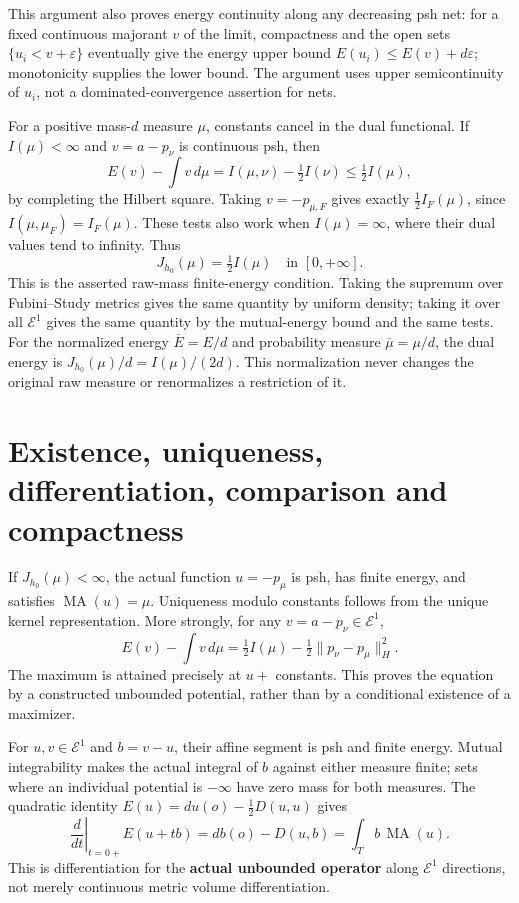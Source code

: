 \documentclass[
  11pt,
]{article}
\begin{document}
This argument also proves energy continuity along any decreasing psh
net: for a fixed continuous majorant \(v\) of the limit, compactness and
the open sets \(\{u_i<v+\varepsilon\}\) eventually give the energy upper
bound \(E(u_i)\leq E(v)+d\varepsilon\); monotonicity supplies the lower
bound. The argument uses upper semicontinuity of \(u_i\), not a
dominated-convergence assertion for nets.

For a positive mass-\(d\) measure \(\mu\), constants cancel in the dual
functional. If \(I(\mu)<\infty\) and \(v=a-p_\nu\) is continuous psh,
then \[
E(v)-\int v\,d\mu=I(\mu,\nu)-\tfrac12 I(\nu)
\leq\tfrac12 I(\mu),
\] by completing the Hilbert square. Taking \(v=-p_{\mu,F}\) gives
exactly \(\tfrac12 I_F(\mu)\), since \(I(\mu,\mu_F)=I_F(\mu)\). These
tests also work when \(I(\mu)=\infty\), where their dual values tend to
infinity. Thus \[
J_{h_0}(\mu)=\tfrac12 I(\mu)\quad\text{in }[0,+\infty].
\] This is the asserted raw-mass finite-energy condition. Taking the
supremum over Fubini--Study metrics gives the same quantity by uniform
density; taking it over all \(\mathcal E^1\) gives the same quantity by
the mutual-energy bound and the same tests. For the normalized energy
\(\overline E=E/d\) and probability measure \(\overline\mu=\mu/d\), the
dual energy is \(J_{h_0}(\mu)/d=I(\mu)/(2d)\). This normalization never
changes the original raw measure or renormalizes a restriction of it.

\section{Existence, uniqueness, differentiation, comparison and
compactness}\label{existence-uniqueness-differentiation-comparison-and-compactness}

If \(J_{h_0}(\mu)<\infty\), the actual function \(u=-p_\mu\) is psh, has
finite energy, and satisfies \(\operatorname{MA}(u)=\mu\). Uniqueness
modulo constants follows from the unique kernel representation. More
strongly, for any \(v=a-p_\nu\in\mathcal E^1\), \[
E(v)-\int v\,d\mu
=\tfrac12 I(\mu)-\tfrac12\|p_\nu-p_\mu\|_H^2.
\] The maximum is attained precisely at \(u+\) constants. This proves
the equation by a constructed unbounded potential, rather than by a
conditional existence of a maximizer.

For \(u,v\in\mathcal E^1\) and \(b=v-u\), their affine segment is psh
and finite energy. Mutual integrability makes the actual integral of
\(b\) against either measure finite; sets where an individual potential
is \(-\infty\) have zero mass for both measures. The quadratic identity
\(E(u)=du(o)-\tfrac12 D(u,u)\) gives \[
\left.\frac{d}{dt}\right|_{t=0+}E(u+tb)
=d b(o)-D(u,b)=\int_T b\,\operatorname{MA}(u).
\] This is differentiation for the \textbf{actual unbounded operator}
along \(\mathcal E^1\) directions, not merely continuous metric volume
differentiation.
\end{document}
